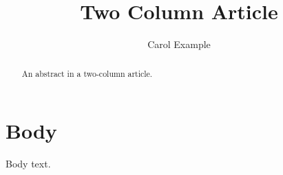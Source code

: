 \documentclass[twocolumn,11pt]{article}
\title{Two Column Article}
\author{Carol Example}
\date{}
\begin{document}
\maketitle
\begin{abstract}
An abstract in a two-column article.
\end{abstract}
\section{Body}
Body text.
\end{document}

